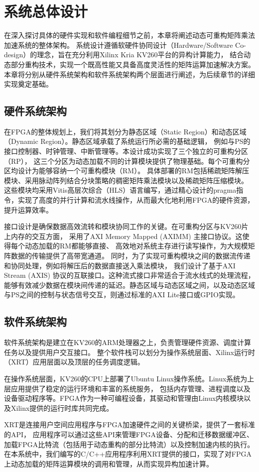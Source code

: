 \chapter{系统总体设计}

在深入探讨具体的硬件实现和软件编程细节之前，本章将阐述动态可重构矩阵乘法加速系统的整体架构。
系统设计遵循软硬件协同设计（Hardware/Software Co-design）的理念，旨在充分利用Xilinx Kria KV260平台的异构计算能力，
结合动态部分重构技术，实现一个既高性能又具备高度灵活性的矩阵运算加速解决方案。
本章将分别从硬件系统架构和软件系统架构两个层面进行阐述，为后续章节的详细实现奠定基础。

\section{硬件系统架构}

在FPGA的整体规划上，我们将其划分为静态区域（Static Region）和动态区域（Dynamic Region）。静态区域承载了系统运行所必需的基础逻辑，
例如与PS的接口控制器、时钟管理、中断管理等。本设计成功实现了三个独立的可重构分区（RP），
这三个分区为动态加载不同的计算模块提供了物理基础。每个可重构分区均设计为能够容纳一个可重构模块（RM）。
具体部署的RM包括稀疏矩阵解压模块、采用脉动阵列结合分块策略的稠密矩阵乘法模块以及稀疏矩阵压缩模块。
这些模块均采用Vitis高层次综合（HLS）语言编写，通过精心设计的pragma指令，实现了高度的并行计算和流水线操作，从而最大化地利用FPGA的硬件资源，提升运算效率。

接口设计是确保数据高效流转和模块协同工作的关键。在可重构分区与KV260片上内存的交互方面，
采用了AXI Memory Mapped (AXIMM) 主接口协议。这使得每个动态加载的RM都能够直接、
高效地对系统主存进行读写操作，为大规模矩阵数据的传输提供了高带宽通道。
同时，为了实现可重构模块之间的数据流传递和协同处理，例如将解压后的数据直接送入乘法模块，
我们设计了基于AXI Stream (AXIS) 协议的互联接口。这种流式接口非常适合于流水线式的处理流程，
能够有效减少数据在模块间传递的延迟。静态区域与动态区域之间，以及动态区域与PS之间的控制与状态信号交互，则通过标准的AXI Lite接口或GPIO实现。

\section{软件系统架构}

软件系统架构是建立在KV260的ARM处理器之上，负责管理硬件资源、调度计算任务以及提供用户交互接口。
整个软件栈可以划分为操作系统层面、Xilinx运行时（XRT）应用层面以及顶层的任务调度逻辑。

在操作系统层面，KV260的CPU上部署了Ubuntu Linux操作系统。Linux系统为上层应用提供了稳定的运行环境和丰富的系统服务，
包括内存管理、进程调度以及设备驱动程序等。FPGA作为一种可编程设备，其驱动和管理由Linux内核模块以及Xilinx提供的运行时库共同完成。

XRT是连接用户空间应用程序与FPGA加速硬件之间的关键桥梁，提供了一套标准的API，
应用程序可以通过这些API来管理FPGA设备、分配和迁移数据缓冲区、加载FPGA比特流（包括用于动态重构的部分比特流）以及控制加速内核的执行。
在本系统中，我们编写的C/C++应用程序利用XRT提供的接口，实现了对FPGA上动态加载的矩阵运算模块的调用和管理，从而实现异构加速计算。
